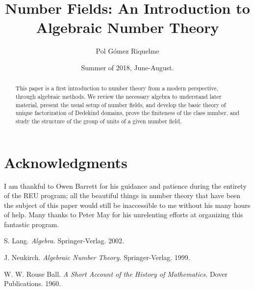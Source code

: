 \documentclass[psamsfonts]{amsart}
\title{Number Fields: An Introduction to Algebraic Number Theory}
\author{Pol Gómez Riquelme}
\date{Summer of 2018, June-August.}
\theoremstyle{definition}
\theoremstyle{remark}
\numberwithin{equation}{section}
\begin{document}
\begin{abstract}

This paper is a first introduction to number theory from a modern perspective, through algebraic methods. We review the necessary algebra to understand later material, present the usual setup of number fields, and develop the basic theory of unique factorization of Dedekind domains, prove the finiteness of the class number, and study the structure of the group of units of a given number field.

\end{abstract}

\maketitle

\tableofcontents











\section*{Acknowledgments}
I am thankful to Owen Barrett for his guidance and patience during the entirety of the REU program; all the beautiful things in number theory that have been the subject of this paper would still be inaccessible to me without his many hours of help. Many thanks to Peter May for his unrelenting efforts at organizing this fantastic program.

\begin{thebibliography}{9}

S. Lang.
\emph{Algebra.}
Springer-Verlag. 2002.

J. Neukirch.
\emph{Algebraic Number Theory.}
Springer-Verlag. 1999.

W. W. Rouse Ball.
\emph{A Short Account of the History of Mathematics.}
Dover Publications. 1960.

\end{thebibliography}
\end{document}
